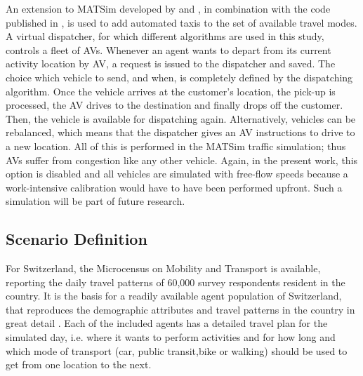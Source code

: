 An extension to MATSim developed by \citet{horl_abmtrans17} and \citet{towards_testbed}, in combination with the code published in \cite{amodeusBase}, is used to add automated taxis to the set of available travel modes. A virtual dispatcher, for which different algorithms are used in this study, controls a fleet of AVs. Whenever an agent wants to depart from its current activity location by AV, a request is issued to the dispatcher and saved.  The choice which vehicle to send, and when, is completely defined by the dispatching algorithm. Once the vehicle arrives at the customer's location, the pick-up is processed, the AV drives to the destination and finally drops off the customer. Then, the vehicle is available for dispatching again. Alternatively, vehicles can be rebalanced, which means that the dispatcher gives an AV  instructions to drive to a new location. All of this is performed in the MATSim traffic simulation; thus AVs suffer from congestion like any other vehicle. Again, in the present work, this option is disabled and all vehicles are simulated with free-flow speeds because a work-intensive calibration would have to have been performed upfront. Such a simulation will be part of future research.


\subsection{Scenario Definition}

For Switzerland, the Microcensus on Mobility and Transport \citep{microcensus} is available, reporting the daily travel patterns of 60,000 survey respondents resident in the country. It is the basis for a readily available agent population of Switzerland, that reproduces the demographic attributes and travel patterns in the country in great detail \citep{ivtbaseline}. Each of the included agents has a detailed travel plan for the simulated day, i.e. where it wants to perform activities and for how long and which mode of transport (car, public transit,bike or walking) should be used to get from one location to the next.


